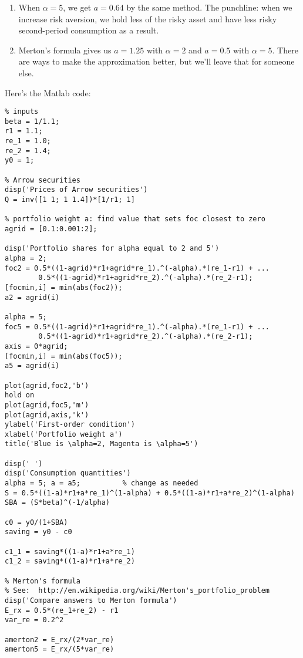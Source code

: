 \documentclass[11pt]{article}
\begin{document}
\begin{enumerate}
\begin{enumerate}
\item When $\alpha=5$, we get $a=0.64$ by the same method.
The punchline:  when we increase risk aversion, we hold less of the risky asset
and have less risky second-period consumption as a result.

\item Merton's formula gives us $a= 1.25$ with $\alpha = 2$
and $a = 0.5 $ with $\alpha = 5$.
There are ways to make the approximation better, but we'll leave that for someone else.
\end{enumerate}
%
Here's the Matlab code:
\begin{verbatim}
% inputs
beta = 1/1.1;
r1 = 1.1;
re_1 = 1.0;
re_2 = 1.4;
y0 = 1;

% Arrow securities
disp('Prices of Arrow securities')
Q = inv([1 1; 1 1.4])*[1/r1; 1]

% portfolio weight a: find value that sets foc closest to zero
agrid = [0.1:0.001:2];

disp('Portfolio shares for alpha equal to 2 and 5')
alpha = 2;
foc2 = 0.5*((1-agrid)*r1+agrid*re_1).^(-alpha).*(re_1-r1) + ...
        0.5*((1-agrid)*r1+agrid*re_2).^(-alpha).*(re_2-r1);
[focmin,i] = min(abs(foc2));
a2 = agrid(i)

alpha = 5;
foc5 = 0.5*((1-agrid)*r1+agrid*re_1).^(-alpha).*(re_1-r1) + ...
        0.5*((1-agrid)*r1+agrid*re_2).^(-alpha).*(re_2-r1);
axis = 0*agrid;
[focmin,i] = min(abs(foc5));
a5 = agrid(i)

plot(agrid,foc2,'b')
hold on
plot(agrid,foc5,'m')
plot(agrid,axis,'k')
ylabel('First-order condition')
xlabel('Portfolio weight a')
title('Blue is \alpha=2, Magenta is \alpha=5')

disp(' ')
disp('Consumption quantities')
alpha = 5; a = a5;          % change as needed
S = 0.5*((1-a)*r1+a*re_1)^(1-alpha) + 0.5*((1-a)*r1+a*re_2)^(1-alpha)
SBA = (S*beta)^(-1/alpha)

c0 = y0/(1+SBA)
saving = y0 - c0

c1_1 = saving*((1-a)*r1+a*re_1)
c1_2 = saving*((1-a)*r1+a*re_2)

% Merton's formula
% See:  http://en.wikipedia.org/wiki/Merton's_portfolio_problem
disp('Compare answers to Merton formula')
E_rx = 0.5*(re_1+re_2) - r1
var_re = 0.2^2

amerton2 = E_rx/(2*var_re)
amerton5 = E_rx/(5*var_re)
\end{verbatim}

\end{enumerate}


\end{document}
